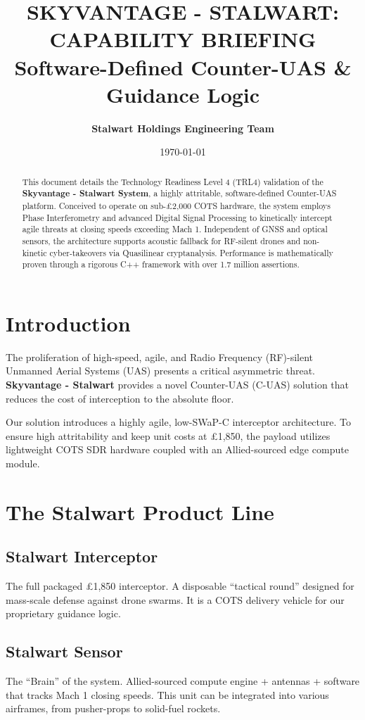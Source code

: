 \documentclass[a4paper,11pt]{article}
\title{\textbf{\color{brandblack}SKYVANTAGE - STALWART: CAPABILITY BRIEFING} \\ \large \color{brandmuted}Software-Defined Counter-UAS \& Guidance Logic}
\author{\textbf{Stalwart Holdings Engineering Team}}
\date{\today}
\begin{document}
\maketitle
\thispagestyle{empty}

\begin{abstract}
\color{brandgrey}
This document details the Technology Readiness Level 4 (TRL4) validation of the \textbf{Skyvantage - Stalwart System}, a highly attritable, software-defined Counter-UAS platform. Conceived to operate on sub-£2,000 COTS hardware, the system employs Phase Interferometry and advanced Digital Signal Processing to kinetically intercept agile threats at closing speeds exceeding Mach 1. Independent of GNSS and optical sensors, the architecture supports acoustic fallback for RF-silent drones and non-kinetic cyber-takeovers via Quasilinear cryptanalysis. Performance is mathematically proven through a rigorous C++ framework with over 1.7 million assertions.
\end{abstract}

\section{Introduction}

The proliferation of high-speed, agile, and Radio Frequency (RF)-silent Unmanned Aerial Systems (UAS) presents a critical asymmetric threat. \textbf{Skyvantage - Stalwart} provides a novel Counter-UAS (C-UAS) solution that reduces the cost of interception to the absolute floor.

Our solution introduces a highly agile, low-SWaP-C interceptor architecture. To ensure high attritability and keep unit costs at £1,850, the payload utilizes lightweight COTS SDR hardware coupled with an Allied-sourced edge compute module.

\section{The Stalwart Product Line}

\subsection{Stalwart Interceptor}
The full packaged £1,850 interceptor. A disposable ``tactical round'' designed for mass-scale defense against drone swarms. It is a COTS delivery vehicle for our proprietary guidance logic.

\subsection{Stalwart Sensor}
The ``Brain'' of the system. Allied-sourced compute engine + antennas + software that tracks Mach 1 closing speeds. This unit can be integrated into various airframes, from pusher-props to solid-fuel rockets.
\end{document}

